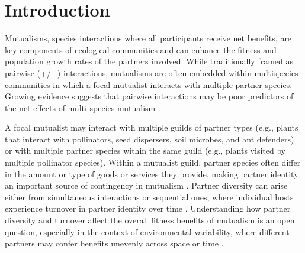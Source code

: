 \documentclass[11pt]{article}
\begin{document}
\newpage{}
\section*{Introduction} \label{res:introduction}
Mutualisms, species interactions where all participants receive net benefits, are key components of ecological communities and can enhance the fitness and population growth rates of the partners involved. 
While traditionally framed as pairwise (+/+) interactions, mutualisms are often embedded within multispecies communities in which a focal mutualist interacts with multiple partner species.
Growing evidence suggests that pairwise interactions may be poor predictors of the net effects of multi-species mutualism \citep{Afkhami2014,Palmer2010,Bascompte2009,Dattilo2014}. 

A focal mutualist may interact with multiple guilds of partner types (e.g., plants that interact with pollinators, seed dispersers, soil microbes, and ant defenders) or with multiple partner species within the same guild (e.g., plants visited by multiple pollinator species). 
Within a mutualist guild, partner species often differ in the amount or type of goods or services they provide, making partner identity an important source of contingency in mutualism \citep{Stanton2003}. 
Partner diversity can arise either from simultaneous interactions or sequential ones, where individual hosts experience turnover in partner identity over time \citep{Djieto-Lordon2005, Ness2006}.
Understanding how partner diversity and turnover affect the overall fitness benefits of mutualism is an open question, especially in the context of environmental variability, where different partners may confer benefits unevenly across space or time  \citep{rogers2014, Thibaut2012, Frederickson2005, Palmer2010}. 
\end{document}
